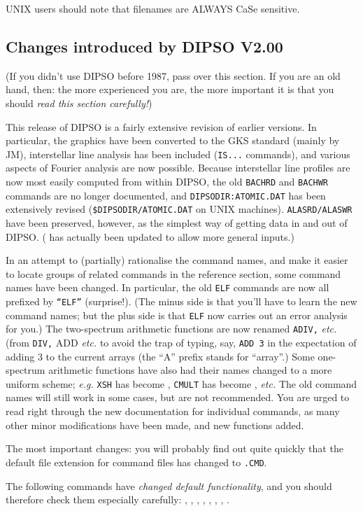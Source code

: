 \documentclass[twoside,11pt,noabs,nolof]{starlink}
\begin{document}
UNIX users should note that filenames are ALWAYS CaSe sensitive.

\subsection{ Changes introduced by DIPSO V2.00}

(If you didn't use DIPSO before 1987, pass over this section. If you
are an old hand, then: the more experienced you are, the more
important it is that you should \emph{read this section carefully!})

This release of DIPSO is a fairly extensive revision of earlier
versions. In particular, the graphics have been converted to the GKS
standard (mainly by JM), interstellar line analysis has been included
({\texttt{IS...}}  commands), and various aspects of Fourier analysis are
now possible. Because interstellar line profiles are now most easily
computed from within DIPSO, the old {\texttt{BACHRD}}  and {\texttt{BACHWR}}
commands are no longer documented, and {\texttt{DIPSODIR:ATOMIC.DAT}}  has
been extensively revised ({\texttt{\$DIPSODIR/ATOMIC.DAT}}  on UNIX
machines). {\texttt{ALASRD/ALASWR}}  have been preserved, however, as the
simplest way of getting data in and out of DIPSO. (  has
actually been updated to allow more general inputs.)

In an attempt to (partially) rationalise the command names, and make it
easier to locate groups of related commands in the reference section,
some command names have been changed. In particular, the old {\texttt{ELF}}
commands are now all prefixed by {\texttt{``ELF''}}  (surprise!). (The minus
side is that you'll have to learn the new command names; but the plus
side is that {\texttt{ELF}}  now carries out an error analysis for you.) The
two-spectrum arithmetic functions are now renamed {\texttt{ADIV,}  }  \emph{etc.} (from {\texttt{DIV,}  ADD} \emph{etc.} to avoid the trap of typing, say,
{\texttt{ADD~3}}  in the expectation of adding 3 to the current arrays (the
``A'' prefix stands for ``array''.) Some one-spectrum arithmetic
functions have also had their names changed to a more uniform scheme;
\emph{e.g.} {\texttt{XSH}}  has become ,  {\texttt{CMULT}}  has become
,  \emph{etc.} The old command names will still work in some cases,
but are not recommended. You are urged to read right through the new
documentation for individual commands, as many other minor modifications
have been made, and new functions added.

The most important changes: you will probably find out quite quickly
that the default file extension for command files has changed to
{\texttt{.CMD}}.

The following commands have \emph{changed default functionality}, and
you should therefore check them especially carefully: ,
,    ,  ,  ,
,  ,  .
\end{document}
